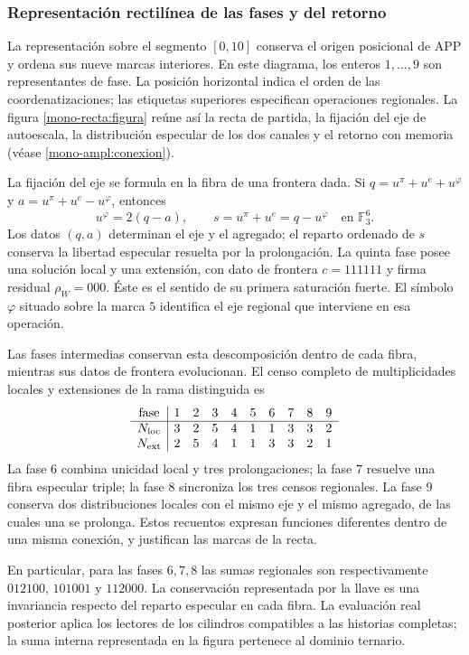 
\subsubsection{Representación rectilínea de las fases y del retorno}
\label{mono-recta:desarrollo}

La representación sobre el segmento \([0,10]\) conserva el origen
posicional de APP y ordena sus nueve marcas interiores. En este diagrama,
los enteros \(1,\ldots,9\) son representantes de fase. La posición
horizontal indica el orden de las coordenatizaciones; las etiquetas superiores
especifican operaciones regionales. La figura
\ref{mono-recta:figura} reúne así la recta de partida, la fijación del
eje de autoescala, la distribución especular de los dos canales y el
retorno con memoria (véase \ref{mono-ampl:conexion}).



La fijación del eje se formula en la fibra de una frontera dada. Si
\(q=u^\pi+u^e+u^\varphi\) y
\(a=u^\pi+u^e-u^\varphi\), entonces
\[
 u^\varphi=2(q-a),\qquad s=u^\pi+u^e=q-u^\varphi
 \quad\text{en }\mathbb F_3^6.
\]
Los datos \((q,a)\) determinan el eje y el agregado; el reparto ordenado
de \(s\) conserva la libertad especular resuelta por la prolongación.
La quinta fase posee una solución local y una extensión, con dato
de frontera \(c=111111\) y firma residual \(\rho_W=000\). Éste es el
sentido de su primera saturación fuerte. El símbolo \(\varphi\)
situado sobre la marca \(5\) identifica el eje regional que interviene
en esa operación.

Las fases intermedias conservan esta descomposición dentro de cada fibra,
mientras sus datos de frontera evolucionan. El censo completo de
multiplicidades locales y extensiones de la rama distinguida es
\[
\begin{array}{c|rrrrrrrrr}
\text{fase}&1&2&3&4&5&6&7&8&9\\\hline
N_{\rm loc}&3&2&5&4&1&1&3&3&2\\
N_{\rm ext}&2&5&4&1&1&3&3&2&1
\end{array}
\]
La fase \(6\) combina unicidad local y tres prolongaciones; la fase
\(7\) resuelve una fibra especular triple; la fase \(8\) sincroniza
los tres censos regionales. La fase \(9\) conserva dos distribuciones
locales con el mismo eje y el mismo agregado, de las cuales una se
prolonga. Estos recuentos expresan funciones diferentes dentro de una
misma conexión, y justifican las marcas de la recta.

En particular, para las fases \(6,7,8\) las sumas regionales son
respectivamente \(012100\), \(101001\) y \(112000\). La conservación
representada por la llave es una invariancia respecto del reparto
especular en cada fibra. La evaluación real posterior aplica los
lectores de los cilindros compatibles a las historias completas; la
suma interna representada en la figura pertenece al dominio ternario.

